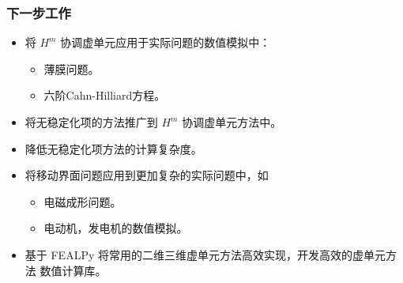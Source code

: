 \documentclass[notheorems,serif]{beamer}
\begin{document}
\begin{frame}
    \frametitle{下一步工作}
    \begin{itemize}
        \item 将 $H^m$ 协调虚单元应用于实际问题的数值模拟中：
        \begin{itemize}
                \item 薄膜问题。
                \item 六阶Cahn-Hilliard方程。
        \end{itemize}
    \item 将无稳定化项的方法推广到 $H^m$ 协调虚单元方法中。
    \item 降低无稳定化项方法的计算复杂度。
    \item 将移动界面问题应用到更加复杂的实际问题中，如
        \begin{itemize}
            \item 电磁成形问题。
            \item 电动机，发电机的数值模拟。
        \end{itemize}
    \item 基于 FEALPy 将常用的二维三维虚单元方法高效实现，开发高效的虚单元方法
        数值计算库。
\end{itemize}
\end{frame}




\begin{frame}
\end{frame}
\end{document}
